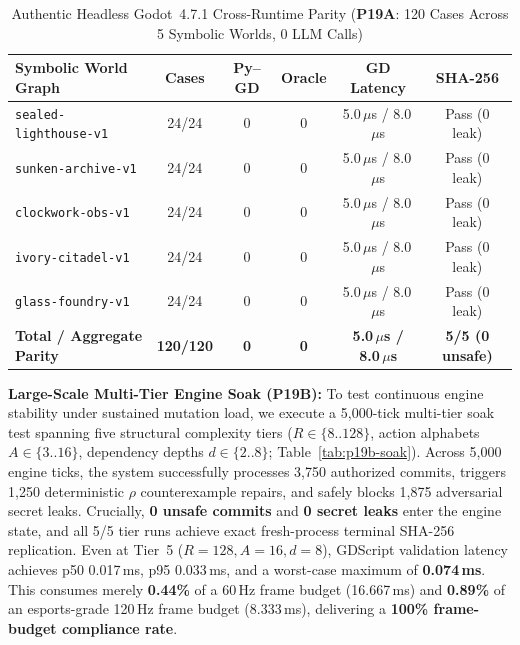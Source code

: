 \begin{table}[!tbp]
\caption{Authentic Headless Godot~4.7.1 Cross-Runtime Parity (\textbf{P19A}: 120 Cases Across 5 Symbolic Worlds, 0 LLM Calls)}
\label{tab:p19a-parity}
\centering
\scriptsize
\setlength{\tabcolsep}{1.8pt}
\begin{tabularx}{\columnwidth}{@{}>{\raggedright\arraybackslash}Xccccc@{}}
\toprule
\textbf{Symbolic World Graph} & \textbf{Cases} & \textbf{Py--GD} & \textbf{Oracle} & \textbf{GD Latency} & \textbf{SHA-256} \\
\midrule
\texttt{sealed-lighthouse-v1}     & 24/24 & 0 & 0 & 5.0\,$\mu$s / 8.0\,$\mu$s & Pass (0 leak) \\
\texttt{sunken-archive-v1}        & 24/24 & 0 & 0 & 5.0\,$\mu$s / 8.0\,$\mu$s & Pass (0 leak) \\
\texttt{clockwork-obs-v1}         & 24/24 & 0 & 0 & 5.0\,$\mu$s / 8.0\,$\mu$s & Pass (0 leak) \\
\texttt{ivory-citadel-v1}         & 24/24 & 0 & 0 & 5.0\,$\mu$s / 8.0\,$\mu$s & Pass (0 leak) \\
\texttt{glass-foundry-v1}         & 24/24 & 0 & 0 & 5.0\,$\mu$s / 8.0\,$\mu$s & Pass (0 leak) \\
\midrule
\textbf{Total / Aggregate Parity} & \textbf{120/120} & \textbf{0} & \textbf{0} & \textbf{5.0\,$\mu$s / 8.0\,$\mu$s} & \textbf{5/5 (0 unsafe)} \\
\bottomrule
\end{tabularx}
\end{table}

\textbf{Large-Scale Multi-Tier Engine Soak (\textbf{P19B}):} To test continuous engine stability under sustained mutation load, we execute a 5,000-tick multi-tier soak test spanning five structural complexity tiers ($R\in\{8..128\}$, action alphabets $A\in\{3..16\}$, dependency depths $d\in\{2..8\}$; Table~\ref{tab:p19b-soak}). Across 5,000 engine ticks, the system successfully processes 3,750 authorized commits, triggers 1,250 deterministic $\rho$ counterexample repairs, and safely blocks 1,875 adversarial secret leaks. Crucially, \textbf{0 unsafe commits} and \textbf{0 secret leaks} enter the engine state, and all 5/5 tier runs achieve exact fresh-process terminal SHA-256 replication. Even at Tier~5 ($R{=}128, A{=}16, d{=}8$), GDScript validation latency achieves p50 0.017\,ms, p95 0.033\,ms, and a worst-case maximum of \textbf{0.074\,ms}. This consumes merely \textbf{0.44\%} of a 60\,Hz frame budget (16.667\,ms) and \textbf{0.89\%} of an esports-grade 120\,Hz frame budget (8.333\,ms), delivering a \textbf{100\% frame-budget compliance rate}.

